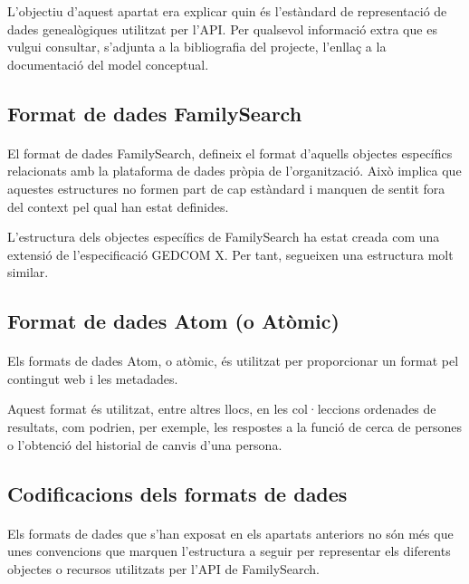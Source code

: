          L’objectiu d’aquest apartat era explicar quin és l'estàndard de representació de dades genealògiques utilitzat per l'API. Per qualsevol informació extra que es vulgui consultar, s’adjunta a la bibliografia del projecte, l’enllaç a la documentació del model conceptual.


     \subsection{Format de dades FamilySearch}

        \paragraph{}
        El format de dades FamilySearch, defineix el format d'aquells objectes específics relacionats amb la plataforma de dades pròpia de l'organització. Això implica que aquestes estructures no formen part de cap estàndard i manquen de sentit fora del context pel qual han estat definides.

        L'estructura dels objectes específics de FamilySearch ha estat creada com una extensió de l'especificació GEDCOM X. Per tant, segueixen una estructura molt similar.


    \subsection{Format de dades Atom (o Atòmic)}

        \paragraph{}
        Els formats de dades Atom, o atòmic, és utilitzat per proporcionar un format pel contingut web i les metadades.

        Aquest format és utilitzat, entre altres llocs, en les col·leccions ordenades de resultats, com podrien, per exemple, les respostes a la funció de cerca de persones o l'obtenció del historial de canvis d’una persona.


    \subsection{Codificacions dels formats de dades}

        \paragraph{}
        Els formats de dades que s’han exposat en els apartats anteriors no són més que unes convencions que marquen l'estructura a seguir per representar els diferents objectes o recursos utilitzats per l'API de FamilySearch.

